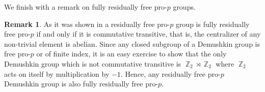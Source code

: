 \documentclass[a4paper]{amsart}
\DeclareMathOperator{\bbz}{\mathbb{Z}}
\theoremstyle{definition}
\newtheorem{rmk}[thm]{Remark}
\begin{document}
We finish with a remark on fully residually free pro-\(p\) groups.

\begin{rmk} As it was shown in \cite[Thm. 7.1]{kochloukovaFullyResiduallyFree2010} a residually free pro-\(p\) group is fully residually free pro-\(p\) if and only if it is commutative transitive, that is, the centralizer of any non-trivial element is abelian. Since any closed subgroup of a Demushkin group is free pro-\(p\) or of finite index, it is an easy exercise to show that the only Demushkin group which is not commutative transitive is \(\bbz_2 \rtimes \bbz_2\) where \(\bbz_2\) acts on itself by multiplication by \(-1\). Hence, any residually free pro-\(p\) Demushkin group is also fully residually free pro-\(p\).
\end{rmk}



\end{document}
